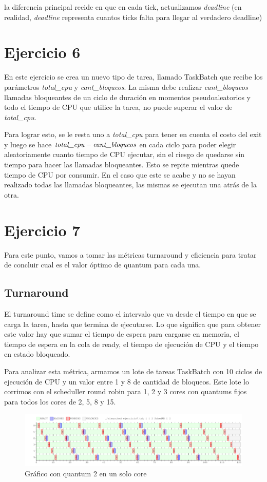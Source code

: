 \documentclass[a4paper,11pt]{article}
\begin{document}
	la diferencia principal recide en que en cada tick, actualizamos \emph{deadline} (en realidad, \emph{deadline} representa cuantos ticks falta para llegar al verdadero deadline)
			
	

\section{Ejercicio 6}

En este ejercicio se crea un nuevo tipo de tarea, llamado TaskBatch que recibe los parámetros \emph{total\_cpu} y \emph{cant\_bloqueos}. La misma debe realizar \emph{cant\_bloqueos} llamadas bloqueantes de un ciclo de duración en momentos pseudoaleatorios y todo el tiempo de CPU que utilice la tarea, no puede superar el valor de \emph{total\_cpu}.

Para lograr esto, se le resta uno a \emph{total\_cpu} para tener en cuenta el costo del exit y luego se hace $\emph{total\_cpu} - \emph{cant\_bloqueos}$ en cada ciclo para poder elegir aleatoriamente cuanto tiempo de CPU ejecutar, sin el riesgo de quedarse sin tiempo para hacer las llamadas bloqueantes. Esto se repite mientras quede tiempo de CPU por consumir. En el caso que este se acabe y no se hayan realizado todas las llamadas bloqueantes, las mismas se ejecutan una atrás de la otra.


\pagebreak

\section{Ejercicio 7}
Para este punto, vamos a tomar las métricas turnaround y eficiencia para tratar de concluir cual es el valor óptimo de quantum para cada una.

\subsection{Turnaround}
El turnaround time se define como el intervalo que va desde el tiempo en que se carga la tarea, hasta que termina de ejecutarse. Lo que significa que para obtener este valor hay que sumar el tiempo de espera para cargarse en memoria, el tiempo de espera en la cola de ready, el tiempo de ejecución de CPU y el tiempo en estado bloqueado.

Para analizar esta métrica, armamos un lote de tareas TaskBatch con 10 ciclos de ejecución de CPU y un valor entre 1 y 8 de cantidad de bloqueos. Este lote lo corrimos con el scheduller round robin para 1, 2 y 3 cores con quantums fijos para todos los cores de 2, 5, 8 y 15.
\begin{figure}[H]
\centering
\includegraphics[scale=.6, width=1\textwidth]{graficos/ej7-1core-q1}
\caption{Gráfico con quantum 2 en un solo core}
\end{figure}
\end{document}

